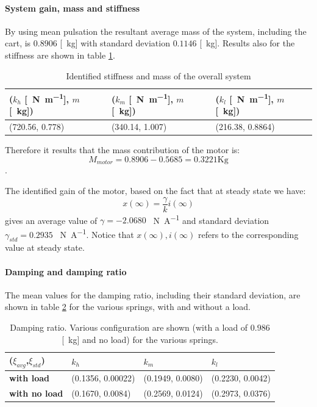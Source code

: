 \paragraph{System gain, mass and  stiffness}
By using   mean pulsation the resultant average mass of the system, including the cart, is $ 0.8906$ [\SI{}{\kilo\gram}] with standard deviation $  0.1146$ [\SI{}{\kilo \gram}]. Results also for the stiffness  are shown in table \ref{table:cart_attached_springs_mass_fl}.
\begin{table}[!h]
\centering

\begin{tabular}{|l|l|l|}
\hline
{\textbf{($k_h$ [\SI{}{\newton \per \metre}], $m$ [\SI{}{\kilo \gram}])}} & \textbf{($k_m$ [\SI{}{\newton \per \metre}], $m$ [\SI{}{\kilo \gram}])} & \textbf{($k_l$ [\SI{}{\newton \per \metre}], $m$ [\SI{}{\kilo \gram}])} \\ \hline
(720.56, 0.778)              & (340.14, 1.007)     & (216.38, 0.8864)     \\ \hline
\end{tabular}

\caption{Identified stiffness and mass of the overall system}
\label{table:cart_attached_springs_mass_fl}
\end{table}
Therefore it results that the mass contribution of the motor is:
$$M_{motor} = 0.8906 -0.5685=0.3221 \text{Kg}$$.

The identified gain of the motor, based on the fact that at steady state we have:
$$x(\infty) = \frac{\gamma}{k} i(\infty)$$
gives an average value of $\gamma=  -2.0680$ \SI{}{\newton \per \ampere} and standard deviation $\gamma_{std}= 0.2935$ \SI{}{\newton \per \ampere}. Notice that $x(\infty), i(\infty)$ refers to the corresponding value at steady state.


\paragraph{Damping and damping ratio}
The mean values for the damping ratio, including their standard deviation, are shown in table \ref{table:cart_attached_dampingratio_fl} for the various springs, with and without a load.
\begin{table}[!h]
\centering


\begin{tabular}{|l|l|l|l|}
\hline
{(\textbf{$\xi_{avg}$},$\xi_{std}$)} & \textbf{$k_h$} & \textbf{$k_m$}   & \textbf{$k_l$}   \\ \hline
\textbf{with load}         & (0.1356,  0.00022)    & (0.1949, 0.0080) & (0.2230, 0.0042) \\ \hline
\textbf{with no load}      & (0.1670, 0.0084)    & (0.2569, 0.0124) & (0.2973, 0.0376)      \\ \hline
\end{tabular}

\caption{Damping ratio. Various configuration are shown (with a load of $0.986$ [\SI{}{\kilo \gram}] and no load) for the various springs. }
\label{table:cart_attached_dampingratio_fl}
\end{table}


